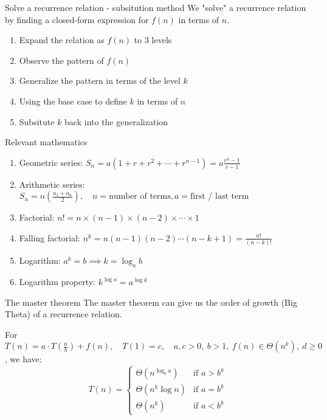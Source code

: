 \begin{theorem}
    {Solve a recurrence relation - subsitution method}
    We "solve" a recurrence relation by finding a closed-form expression for $f(n)$ in terms of $n$.
    \begin{enumerate}
        \item Expand the relation as $f(n)$ to 3 levels
        \item Observe the pattern of $f(n)$
        \item Generalize the pattern in terms of the level $k$
        \item Using the base case to define $k$ in terms of $n$
        \item Subsitute $k$ back into the generalization
    \end{enumerate}
\end{theorem}

\begin{knBox}
    {Relevant mathematics}
    \begin{enumerate}
        \item Geometric series: $S_n = a(1 + r + r^2 + \cdots + r^{n-1}) = a\frac{r^n - 1}{r-1}$
        \item Arithmetic series: $S_n = n(\frac{a_1+a_n}{2}),\quad n=\text{number of terms}, a=\text{first / last term}$
        \item Factorial: $n! = n \times (n-1) \times (n-2) \times \cdots \times 1$
        \item Falling factorial: $n^{\underline{k}} = n(n-1)(n-2)\cdots(n-k+1)=\frac{n!}{(n-k)!}$
        \item Logarithm: $a^k=b\implies k=\log_a b$
        \item Logarithm property: $k^{\log a} = a^{\log k}$
    \end{enumerate}
\end{knBox}

\begin{theorem}
    {The master theorem}
    The master theorem can give us the order of growth (Big Theta) of a recurrence relation.

    For $T(n) = a\cdot T(\frac{n}{b}) + f(n),\quad T(1) = c,\quad a, c > 0,\ b > 1,\ f(n)\in \Theta(n^k),\ d\geq 0$, we have:
    \[T(n) = \begin{cases}
            \Theta(n^{\log_b a}) & \text{if } a > b^k \\
            \Theta(n^k \log n)   & \text{if } a = b^k \\
            \Theta(n^k)          & \text{if } a < b^k
        \end{cases}\]
\end{theorem}


